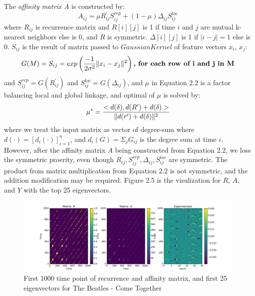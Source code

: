 \documentclass[final]{siamltexmm}
\begin{document}
The \textit{affinity matrix A} is constructed by:
\begin{equation}
A_{ij} = \mu R^{\prime}_{ij}S^{rep}_{ij} + (1-\mu)\Delta_{ij}S^{loc}_{ij}
\end{equation}
where $R_{ij}$ is recurrence matrix and $R[i][j]$ is 1 if time $i$ and $j$ are mutual k-nearest neighbors else is 0, and $R$ is symmetric. $\Delta[i][j]$ is 1 if $|i-j|=1$ else is 0. $S_{ij}$ is the result of matrix passed to $Gaussian Kernel$ of feature vectors $x_i$, $x_j$:
\begin{equation}
G(M) = S_{ij} = exp\left( {-1\over2\sigma^2} \|x_i-x_j\|^2  \right) \textbf{, for each row of i and j in M}
\end{equation}
and $S^{rep}_{ij} = G(R^{\prime}_{ij})$ and $S^{loc}_{ij} = G(\Delta_{ij})$, and $\mu$ in Equation 2.2 is a factor balancing local and global linkage, and optimal of $\mu$ is solved by:
\begin{equation}
\mu^{\ast} = {<d(\delta), d(R^{\prime})+d(\delta) >\over \|d(r^{\prime})+d(\delta)\|^2}
\end{equation}
where we treat the input matrix as vector of degree-sum where $d(\cdot)=[d_i(\cdot)]^n_{i=1}$, and $d_i(G) = \Sigma_jG_{ij}$ is the degree sum at time $i$. However, after the affinity matrix $A$ being constructed from Equation 2.2, we loss the symmetric proerity, even though $R^{\prime}_{ij}, S^{rep}_{ij}, \Delta_{ij}, S^{loc}_{ij}$ are symmetric. The product from matrix multiplication from Equation 2.2 is not symmetric, and the addition modification may be required. Figure 2.5 is the visulization for $R$, $A$, and $Y$ with the top 25 eigenvectors.

\begin{figure}[H]
  \centering
    \includegraphics[width=1\textwidth]{./figure/allMatrix.png}
  \caption{First 1000 time point of recurrence and affinity matrix, and first 25 eigenvectors for The Beatles - Come Together}
\end{figure}
\end{document}
